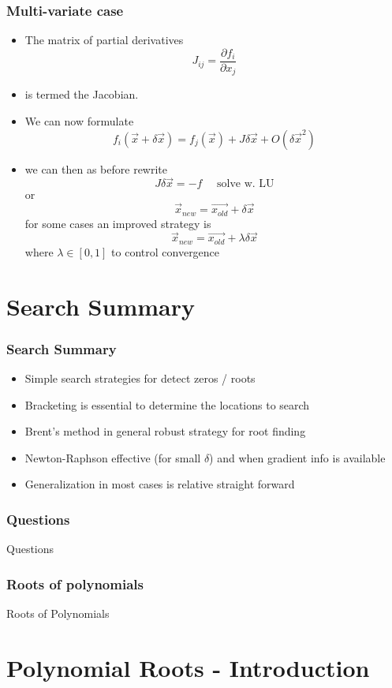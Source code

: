 \documentclass[10pt]{beamer}
\begin{document}
\begin{frame}
  \frametitle{Multi-variate case}
  \begin{itemize}
  \item The matrix of partial derivatives
    \[
      J_{ij} = \frac{\partial f_i}{\partial x_j}
    \]
  \item is termed the Jacobian. 
  \item We can now formulate
    \[
      f_i (\vec{x} + \delta\vec{x}) = f_j(\vec{x}) + J \delta \vec{x} + O(\delta\vec{x}^2)
    \]
  \item we can then as before rewrite
    \[
      J \delta \vec{x} = -f \mbox{ ~~ solve w. LU}
    \]
    or
    \[
      \vec{x}_{new} = \vec{x_{old}} + \delta \vec{x}
    \]
    for some cases an improved strategy is 
    \[
      \vec{x}_{new} = \vec{x_{old}} + \lambda \delta \vec{x}
    \] where $\lambda \in [0,1]$ to control convergence
  \end{itemize}
\end{frame}

\section{Search Summary}

\begin{frame}
  \frametitle{Search Summary}
  \begin{itemize}
  \item Simple search strategies for detect zeros / roots
  \item Bracketing is essential to determine the locations to search
  \item Brent's method in general robust strategy for root finding
  \item Newton-Raphson effective (for small $\delta$) and when gradient info is available
  \item Generalization in most cases is relative straight forward
  \end{itemize}
\end{frame}

\begin{frame}
  \frametitle{Questions}
  \centerline{\Huge Questions}
\end{frame}

\begin{frame}[plain]
  \frametitle{Roots of polynomials}
  \centerline{\Huge Roots of Polynomials}
\end{frame}

\section{Polynomial Roots - Introduction}
\end{document}
